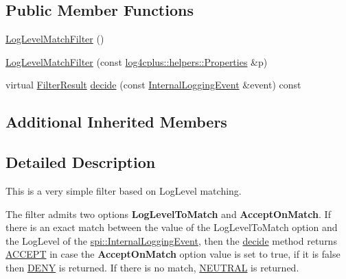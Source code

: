 \subsection*{Public Member Functions}
\begin{DoxyCompactItemize}
\item 
\hyperlink{classlog4cplus_1_1spi_1_1LogLevelMatchFilter_a9027e7c47bf2adfffbf44e0b803a01eb}{Log\-Level\-Match\-Filter} ()
\item 
\hyperlink{classlog4cplus_1_1spi_1_1LogLevelMatchFilter_a6536462ecf4d32eaaab71ef212132dc6}{Log\-Level\-Match\-Filter} (const \hyperlink{classlog4cplus_1_1helpers_1_1Properties}{log4cplus\-::helpers\-::\-Properties} \&p)
\item 
virtual \hyperlink{namespacelog4cplus_1_1spi_aa910f475d36c00f943ef78e37d11e3f6}{Filter\-Result} \hyperlink{classlog4cplus_1_1spi_1_1LogLevelMatchFilter_ab9d292692d09079ce2baeb4c7d40df92}{decide} (const \hyperlink{classlog4cplus_1_1spi_1_1InternalLoggingEvent}{Internal\-Logging\-Event} \&event) const 
\end{DoxyCompactItemize}
\subsection*{Additional Inherited Members}


\subsection{Detailed Description}
This is a very simple filter based on Log\-Level matching.

The filter admits two options {\bfseries Log\-Level\-To\-Match} and {\bfseries Accept\-On\-Match}. If there is an exact match between the value of the Log\-Level\-To\-Match option and the Log\-Level of the \hyperlink{classlog4cplus_1_1spi_1_1InternalLoggingEvent}{spi\-::\-Internal\-Logging\-Event}, then the \hyperlink{classlog4cplus_1_1spi_1_1LogLevelMatchFilter_ab9d292692d09079ce2baeb4c7d40df92}{decide} method returns \hyperlink{namespacelog4cplus_1_1spi_aa910f475d36c00f943ef78e37d11e3f6a222b6ce4c30f1d7d9164b901bb2907a7}{A\-C\-C\-E\-P\-T} in case the {\bfseries Accept\-On\-Match} option value is set to {\ttfamily true}, if it is {\ttfamily false} then \hyperlink{namespacelog4cplus_1_1spi_aa910f475d36c00f943ef78e37d11e3f6a4782fd85324c15b37a4de87628f51634}{D\-E\-N\-Y} is returned. If there is no match, \hyperlink{namespacelog4cplus_1_1spi_aa910f475d36c00f943ef78e37d11e3f6ae75ab2e37a542c14fe57be606502a550}{N\-E\-U\-T\-R\-A\-L} is returned. 

